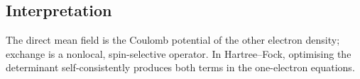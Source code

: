 \subsection*{Interpretation}
The direct mean field is the Coulomb potential
of the other electron density; exchange is a
nonlocal, spin-selective operator. In Hartree--Fock,
optimising the determinant self-consistently produces
both terms in the one-electron equations.
